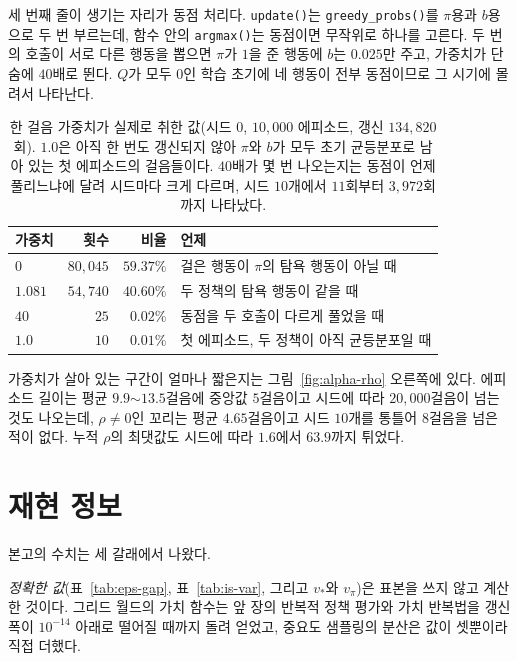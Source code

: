 \documentclass[11pt,a4paper]{article}
\begin{document}
세 번째 줄이 생기는 자리가 동점 처리다. \lstinline|update()|는 \lstinline|greedy_probs()|를 $\pi$용과
$b$용으로 두 번 부르는데, 함수 안의 \lstinline|argmax()|는 동점이면 무작위로 하나를 고른다. 두 번의
호출이 서로 다른 행동을 뽑으면 $\pi$가 $1$을 준 행동에 $b$는 $0.025$만 주고, 가중치가 단숨에 $40$배로
뛴다. $Q$가 모두 $0$인 학습 초기에 네 행동이 전부 동점이므로 그 시기에 몰려서 나타난다.

\begin{table}[htbp]
\centering
\caption{한 걸음 가중치가 실제로 취한 값(시드 $0$, $10{,}000$ 에피소드, 갱신 $134{,}820$회).
$1.0$은 아직 한 번도 갱신되지 않아 $\pi$와 $b$가 모두 초기 균등분포로 남아 있는 첫 에피소드의
걸음들이다. $40$배가 몇 번 나오는지는 동점이 언제 풀리느냐에 달려 시드마다 크게 다르며, 시드
$10$개에서 $11$회부터 $3{,}972$회까지 나타났다.}
\label{tab:rho-values}
\small
\begin{tabular}{@{}lrrl@{}}
\toprule
가중치 & 횟수 & 비율 & 언제 \\
\midrule
$0$      & $80{,}045$ & $59.37\%$ & 걸은 행동이 $\pi$의 탐욕 행동이 아닐 때 \\
$1.081$  & $54{,}740$ & $40.60\%$ & 두 정책의 탐욕 행동이 같을 때 \\
$40$     & $25$       & $0.02\%$  & 동점을 두 호출이 다르게 풀었을 때 \\
$1.0$    & $10$       & $0.01\%$  & 첫 에피소드, 두 정책이 아직 균등분포일 때 \\
\bottomrule
\end{tabular}
\end{table}

가중치가 살아 있는 구간이 얼마나 짧은지는 그림~\ref{fig:alpha-rho} 오른쪽에 있다. 에피소드 길이는
평균 $9.9$$\sim$$13.5$걸음에 중앙값 $5$걸음이고 시드에 따라 $20{,}000$걸음이 넘는 것도 나오는데,
$\rho \neq 0$인 꼬리는 평균 $4.65$걸음이고 시드 $10$개를 통틀어 $8$걸음을 넘은 적이 없다. 누적
$\rho$의 최댓값도 시드에 따라 $1.6$에서 $63.9$까지 튀었다.


\section*{재현 정보}

본고의 수치는 세 갈래에서 나왔다.

\emph{정확한 값}(표~\ref{tab:eps-gap}, 표~\ref{tab:is-var}, 그리고 $v_*$와 $v_\pi$)은 표본을 쓰지
않고 계산한 것이다. 그리드 월드의 가치 함수는 앞 장의 반복적 정책 평가와 가치 반복법을 갱신 폭이
$10^{-14}$ 아래로 떨어질 때까지 돌려 얻었고, 중요도 샘플링의 분산은 값이 셋뿐이라 직접 더했다.
\end{document}
